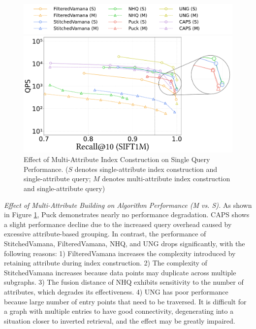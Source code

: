 \documentclass[sigconf, nonacm]{acmart}
\begin{document}
	\begin{figure}[t]
		\centering
		
		\hspace*{15pt} %
		\includegraphics[width=0.85\columnwidth]{figures/exp/exp_2_legend.pdf} %
		
		
		\includegraphics[width=0.7\columnwidth]{figures/exp/exp_2_1.pdf}
		\caption{Effect of Multi-Attribute Index Construction on Single Query Performance. ($S$ denotes single-attribute index construction and single-attribute query; $M$ denotes multi-attribute index construction and single-attribute query)}
		\label{fig:exp_2_1}
		
	\end{figure}
	
	\textit{Effect of Multi-Attribute Building on Algorithm Performance (M vs. S).}
	As shown in Figure \ref{fig:exp_2_1}, Puck demonstrates nearly no performance degradation.  CAPS shows a slight performance decline due to the increased query overhead caused by excessive attribute-based grouping. In contrast, the performance of StitchedVamana, FilteredVamana, NHQ, and UNG drops significantly, with the following reasons: 1) FilteredVamana increases the complexity introduced by retaining attribute during index construction. 2) The complexity of StitchedVamana increases because data points may duplicate across multiple subgraphs. 3) The fusion distance of NHQ exhibits sensitivity to the number of attributes, which degrades its effectiveness. 4) UNG has poor performance because large number of entry points that need to be traversed. It is difficult for a graph with multiple entries to have good connectivity, degenerating into a situation closer to inverted retrieval, and the effect may be greatly impaired.
	
\end{document}
